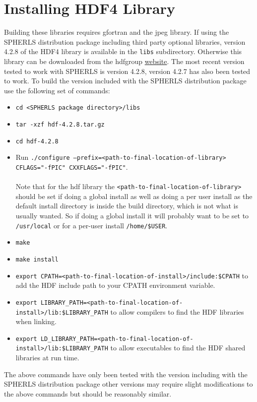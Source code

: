 \documentclass[12pt,a4paper]{book}
\begin{document}
\section{Installing HDF4 Library}
Building these libraries requires gfortran and the jpeg library. If using the SPHERLS distribution package including third party optional libraries, version 4.2.8 of the HDF4 library is available in the {\tt libs} subdirectory. Otherwise this library can be downloaded from the hdfgroup \href{http://www.hdfgroup.org/ftp/HDF/HDF_Current/src/}{website}. The most recent version tested to work with SPHERLS is version 4.2.8, version 4.2.7 has also been tested to work. To build the version included with the SPHERLS distribution package use the following set of commands:
\begin{itemize}
\item {\tt cd <SPHERLS package directory>/libs}
\item {\tt tar -xzf hdf-4.2.8.tar.gz}
\item {\tt cd hdf-4.2.8}
\item Run {\tt ./configure --prefix=<path-to-final-location-of-library> CFLAGS="-fPIC" CXXFLAGS="-fPIC"}.\\
 \\
Note that for the hdf library the {\tt <path-to-final-}{\tt location-of-library>} should be set if doing a global install as well as doing a per user install as the default install directory is inside the build directory, which is not what is usually wanted. So if doing a global install it will probably want to be set to {\tt /usr/local} or for a per-user install {\tt /home/\$USER}.
 \\
\item {\tt make}
\item {\tt make install}
\item {\tt export CPATH=<path-to-final-location-of-install>/include:\$CPATH} to add the HDF include path to your CPATH environment variable.
\item {\tt export LIBRARY\_PATH=<path-to-final-location-of-install>/lib:\$LIBRARY\_PATH} to allow compilers to find the HDF libraries when linking.
\item {\tt export LD\_LIBRARY\_PATH=<path-to-final-location-of-install>/lib:\$LIBRARY\_PATH} to allow executables to find the HDF shared libraries at run time.
\end{itemize}
The above commands have only been tested with the version including with the SPHERLS distribution package other versions may require slight modifications to the above commands but should be reasonably similar.
\end{document}
